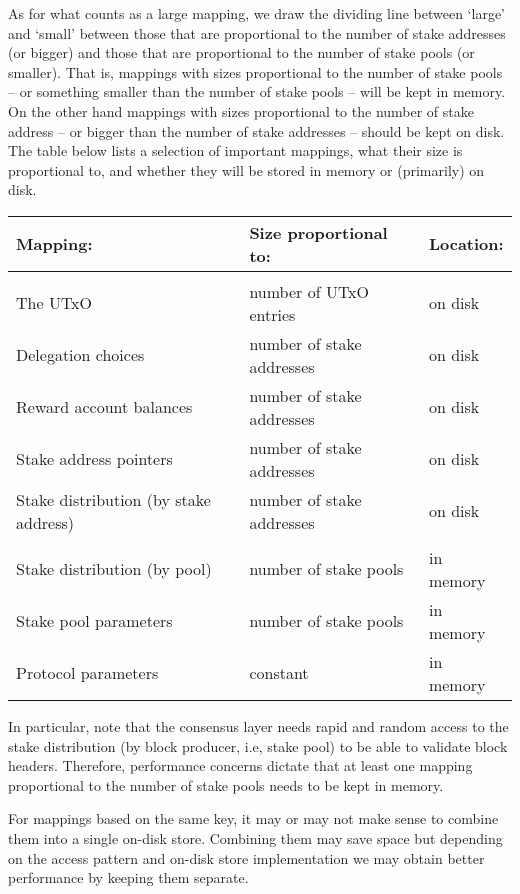 \documentclass[11pt,a4paper]{article}
\begin{document}
As for what counts as a large mapping, we draw the dividing line between `large'
and `small' between those that are proportional to the number of stake addresses
(or bigger) and those that are proportional to the number of stake pools (or
smaller). That is, mappings with sizes proportional to the number of stake pools
-- or something smaller than the number of stake pools -- will be kept in
memory. On the other hand mappings with sizes proportional to the number of
stake address -- or bigger than the number of stake addresses -- should be kept
on disk. The table below lists a selection of important mappings, what their
size is proportional to, and whether they will be stored in memory or
(primarily) on disk.
\begin{center}
\begin{tabular}{lll}
Mapping: & Size proportional to: & Location: \\
\hline \hline \\
The UTxO                              & number of UTxO entries    & on disk \\
Delegation choices                    & number of stake addresses & on disk \\
Reward account balances               & number of stake addresses & on disk \\
Stake address pointers                & number of stake addresses & on disk \\
Stake distribution (by stake address) & number of stake addresses & on disk \\
\hline \\
Stake distribution (by pool)          & number of stake pools & in memory \\
Stake pool parameters                 & number of stake pools & in memory \\
Protocol parameters                   & constant              & in memory
\end{tabular}
\end{center}
In particular, note that the consensus layer needs rapid and random access to
the stake distribution (by block producer, i.e, stake pool) to be able to
validate block headers. Therefore, performance concerns dictate that at least
one mapping proportional to the number of stake pools needs to be kept in
memory.

For mappings based on the same key, it may or may not make sense to combine them
into a single on-disk store. Combining them may save space but depending on the
access pattern and on-disk store implementation we may obtain better
performance by keeping them separate.
\end{document}
